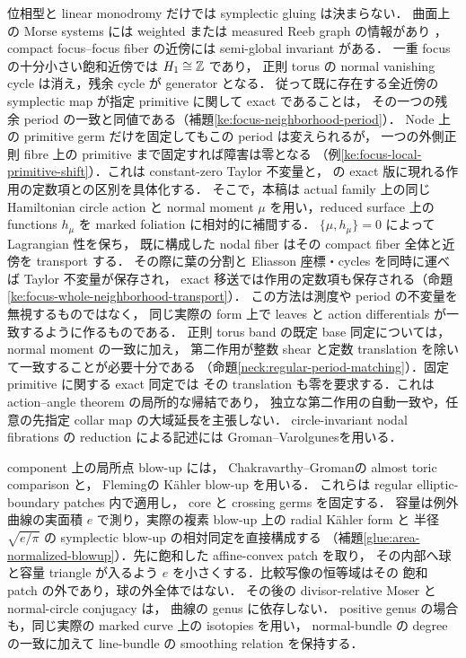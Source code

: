 位相型と linear monodromy だけでは symplectic gluing は決まらない．
曲面上の Morse systems には weighted または measured Reeb graph の情報があり
\cite{DMT,IKM}，compact focus--focus fiber の近傍には
semi-global invariant がある\cite[Theorem 2.1]{VuNgoc}．
一重 focus の十分小さい飽和近傍では $H_1\cong\mathbb Z$ であり，
正則 torus の normal vanishing cycle は消え，残余 cycle が generator となる．
従って既に存在する全近傍の symplectic map が指定 primitive に関して exact であることは，
その一つの残余 period の一致と同値である（補題\ref{ke:focus-neighborhood-period}）．
Node 上の primitive germ だけを固定してもこの period は変えられるが，
一つの外側正則 fibre 上の primitive まで固定すれば障害は零となる
（例\ref{ke:focus-local-primitive-shift}）．これは constant-zero Taylor 不変量と，
\cite[\S7]{VuNgoc}の exact 版に現れる作用の定数項との区別を具体化する．
そこで，本稿は actual family 上の同じ Hamiltonian circle action と
normal moment $\mu$ を用い，reduced surface 上の functions $h_\mu$ を
marked foliation に相対的に補間する．
$\{\mu,h_\mu\}=0$ によって Lagrangian 性を保ち，
既に構成した nodal fiber はその compact fiber 全体と近傍を transport する．
その際に葉の分割と Eliasson 座標・cycles を同時に運べば Taylor 不変量が保存され，
exact 移送では作用の定数項も保存される（命題\ref{ke:focus-whole-neighborhood-transport}）．
この方法は測度や period の不変量を無視するものではなく，
同じ実際の form 上で leaves と action differentials が一致するように作るものである．
正則 torus band の既定 base 同定については，normal moment の一致に加え，
第二作用が整数 shear と定数 translation を除いて一致することが必要十分である
（命題\ref{neck:regular-period-matching}）．固定 primitive に関する exact 同定では
その translation も零を要求する．これは action--angle theorem の局所的な帰結であり，
独立な第二作用の自動一致や，任意の先指定 collar map の大域延長を主張しない．
circle-invariant nodal fibrations の reduction による記述には
Groman--Varolgunes\cite[\S7.3]{GV}を用いる．

component 上の局所点 blow-up には，
Chakravarthy--Groman\cite[Theorem 1.1]{CGblowup}の almost toric comparison と，
Fleming\cite[Proposition 4.6, Construction 4.7]{Fleming}の Kähler blow-up を用いる．
これらは regular elliptic-boundary patches 内で適用し，
core と crossing germs を固定する．
容量は例外曲線の実面積 $e$ で測り，実際の複素 blow-up 上の radial K\"ahler form と
半径 $\sqrt{e/\pi}$ の symplectic blow-up の相対同定を直接構成する
（補題\ref{glue:area-normalized-blowup}）．先に飽和した affine-convex patch を取り，
その内部へ球と容量 triangle が入るよう $e$ を小さくする．比較写像の恒等域はその
飽和 patch の外であり，球の外全体ではない．
その後の divisor-relative Moser と normal-circle conjugacy は，
曲線の genus に依存しない．
positive genus の場合も，同じ実際の marked curve 上の isotopies を用い，
normal-bundle の degree の一致に加えて line-bundle の smoothing relation を保持する．

